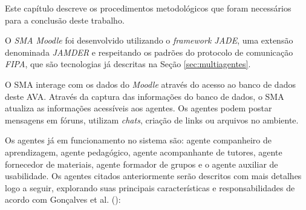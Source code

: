 \label{sec:metodologia}
\iniciocapitulo

Este capítulo descreve os procedimentos metodológicos que foram necessários para a conclusão deste trabalho.

\label{sec:analisesma}

O \textit{SMA Moodle} foi desenvolvido utilizando o \textit{framework JADE}, uma extensão denominada \textit{JAMDER} e respeitando os padrões do protocolo de comunicação \textit{FIPA}, que são tecnologias já descritas na Seção \ref{sec:multiagentes}.

O SMA interage com os dados do \textit{Moodle} através do acesso ao banco de dados deste AVA. Através da captura das informações do banco de dados, o SMA atualiza as informações acessíveis aos agentes. Os agentes podem postar mensagens em fóruns, utilizam \textit{chats}, criação de links ou arquivos no ambiente.

  Os agentes já em funcionamento no sistema são: agente companheiro de aprendizagem, agente pedagógico, agente acompanhante de tutores, agente fornecedor de materiais, agente formador de grupos e o agente auxiliar de usabilidade. Os agentes citados anteriormente serão descritos com mais detalhes logo a seguir, explorando suas principais características e responsabilidades de acordo com Gonçalves et al. (\citeyear{gonccalvesabordagem}):

